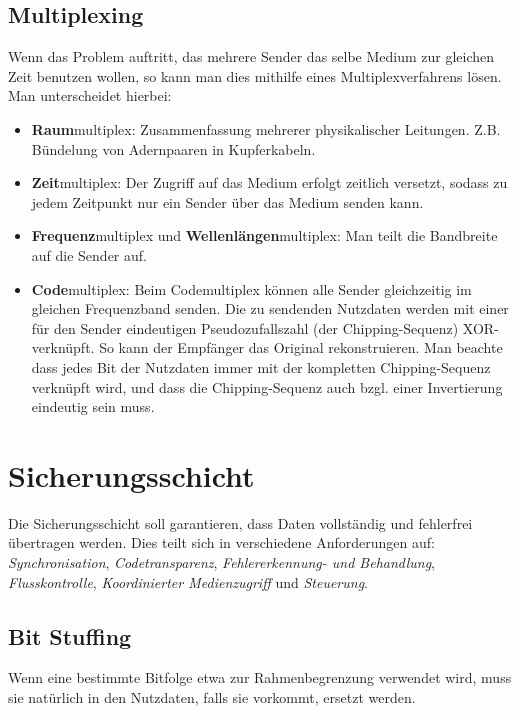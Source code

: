 \documentclass[a4paper,parskip=half*,DIV=15,fontsize=11pt]{scrartcl}
\begin{document}
\subsection{Multiplexing}
Wenn das Problem auftritt, das mehrere Sender das selbe Medium zur gleichen Zeit benutzen wollen, so kann man dies mithilfe eines Multiplexverfahrens lösen. Man unterscheidet hierbei:

\begin{itemize}
	\item \textbf{Raum}multiplex: Zusammenfassung mehrerer physikalischer Leitungen. Z.B. Bündelung von Adernpaaren in Kupferkabeln.
    \item \textbf{Zeit}multiplex: Der Zugriff auf das Medium erfolgt zeitlich versetzt, sodass zu jedem Zeitpunkt nur ein Sender über das Medium senden kann.
    \item \textbf{Frequenz}multiplex und \textbf{Wellenlängen}multiplex: Man teilt die Bandbreite auf die Sender auf.
    \item \textbf{Code}multiplex: Beim Codemultiplex können alle Sender gleichzeitig im gleichen Frequenzband senden. Die zu sendenden Nutzdaten werden mit einer für den Sender eindeutigen Pseudozufallszahl (der Chipping-Sequenz) XOR-verknüpft. So kann der Empfänger das Original rekonstruieren. Man beachte dass jedes Bit der Nutzdaten immer mit der kompletten Chipping-Sequenz verknüpft wird, und dass die Chipping-Sequenz auch bzgl. einer Invertierung eindeutig sein muss.
\end{itemize}

\section{Sicherungsschicht}

Die Sicherungsschicht soll garantieren, dass Daten vollständig und fehlerfrei übertragen werden. Dies teilt sich in verschiedene Anforderungen auf: \emph{Synchronisation}, \emph{Codetransparenz}, \emph{Fehlererkennung- und Behandlung}, \emph{Flusskontrolle}, \emph{Koordinierter Medienzugriff} und \emph{Steuerung}.

\subsection{Bit Stuffing}

Wenn eine bestimmte Bitfolge etwa zur Rahmenbegrenzung verwendet wird, muss sie natürlich in den Nutzdaten, falls sie vorkommt, ersetzt werden.
\end{document}
